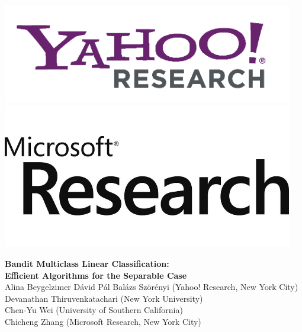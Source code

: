\documentclass[landscape,a0a,final]{a0poster}
\begin{document}


\vspace*{5cm}
\noindent
\begin{minipage}[c]{10.4in}%
\includegraphics[width=5in, trim={0 0 0 0},clip]{figures/yahoo.png}
\hspace*{0.4in}
\includegraphics[width=5in, trim={0 0 0 0},clip]{figures/microsoft.png}
\end{minipage}
\hspace*{-3.5in}
\begin{minipage}[c]{32in}%
\centering
\fontsize{80}{90} \textbf{Bandit Multiclass Linear Classification: } \\[0.5cm] \textbf{Efficient Algorithms for the Separable Case}\\[1cm] %
\fontsize{45}{46} \selectfont Alina Beygelzimer \quad D{\'a}vid P{\'al} \quad Bal{\'a}zs Sz{\"o}r{\'e}nyi (Yahoo! Research, New York City) \\ Devanathan Thiruvenkatachari (New York University) \\ Chen-Yu Wei (University of Southern California) \\ Chicheng Zhang (Microsoft Research, New York City)\\[0.3cm] %
\end{minipage}
\end{document}
